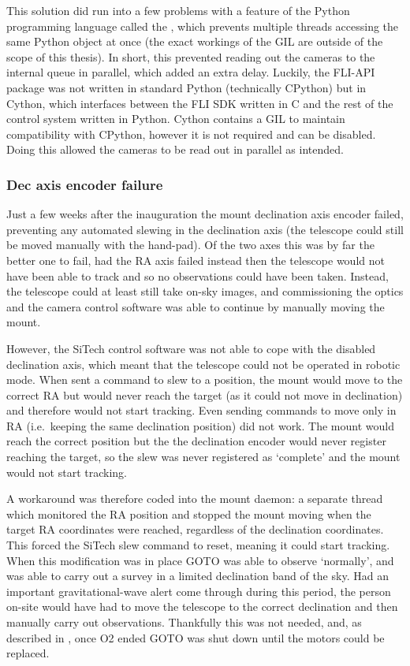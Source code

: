 \begin{colsection}
This solution did run into a few problems with a feature of the Python programming language called the , which prevents multiple threads accessing the same Python object at once (the exact workings of the GIL are outside of the scope of this thesis). In short, this prevented reading out the cameras to the internal queue in parallel, which added an extra delay. Luckily, the FLI-API package was not written in standard Python (technically CPython) but in Cython, which interfaces between the FLI SDK written in C and the rest of the control system written in Python. Cython contains a GIL to maintain compatibility with CPython, however it is not required and can be disabled. Doing this allowed the cameras to be read out in parallel as intended.

\subsubsection{Dec axis encoder failure}

Just a few weeks after the inauguration the mount declination axis encoder failed, preventing any automated slewing in the declination axis (the telescope could still be moved manually with the hand-pad). Of the two axes this was by far the better one to fail, had the RA axis failed instead then the telescope would not have been able to track and so no observations could have been taken. Instead, the telescope could at least still take on-sky images, and commissioning the optics and the camera control software was able to continue by manually moving the mount.

However, the SiTech control software was not able to cope with the disabled declination axis, which meant that the telescope could not be operated in robotic mode. When sent a command to slew to a position, the mount would move to the correct RA but would never reach the target (as it could not move in declination) and therefore would not start tracking. Even sending commands to move only in RA (i.e.\ keeping the same declination position) did not work. The mount would reach the correct position but the the declination encoder would never register reaching the target, so the slew was never registered as `complete' and the mount would not start tracking.

A workaround was therefore coded into the mount daemon: a separate thread which monitored the RA position and stopped the mount moving when the target RA coordinates were reached, regardless of the declination coordinates. This forced the SiTech slew command to reset, meaning it could start tracking. When this modification was in place GOTO was able to observe `normally', and was able to carry out a survey in a limited declination band of the sky. Had an important gravitational-wave alert come through during this period, the person on-site would have had to move the telescope to the correct declination and then manually carry out observations. Thankfully this was not needed, and, as described in , once O2 ended GOTO was shut down until the motors could be replaced.


\end{colsection}
